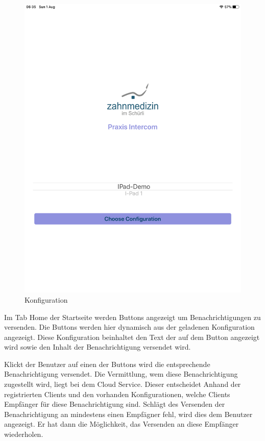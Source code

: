 \begin{figure}[h]
\begin{minipage}[b]{0.4\textwidth}
        \includegraphics[width=\textwidth]{graphics/screenshots/mobileclient/screenshot-select-config}
        \caption{Konfiguration}
    \end{minipage}
    \label{fig:MobileClient-Screens1}
\end{figure}

\clearpage

Im Tab Home der Startseite werden Buttons angezeigt um Benachrichtigungen zu versenden.
Die Buttons werden hier dynamisch aus der geladenen Konfiguration angezeigt.
Diese Konfiguration beinhaltet den Text der auf dem Button angezeigt wird sowie den Inhalt der Benachrichtigung versendet wird.

Klickt der Benutzer auf einen der Buttons wird die entsprechende Benachrichtigung versendet.
Die Vermittlung, wem diese Benachrichtigung zugestellt wird, liegt bei dem Cloud Service.
Dieser entscheidet Anhand der registrierten Clients und den vorhanden Konfigurationen, welche Clients Empfänger für diese Benachrichtigung sind.
Schlägt des Versenden der Benachrichtigung an mindestens einen Empfägner fehl, wird dies dem Benutzer angezeigt.
Er hat dann die Möglichkeit, das Versenden an diese Empfänger wiederholen.

